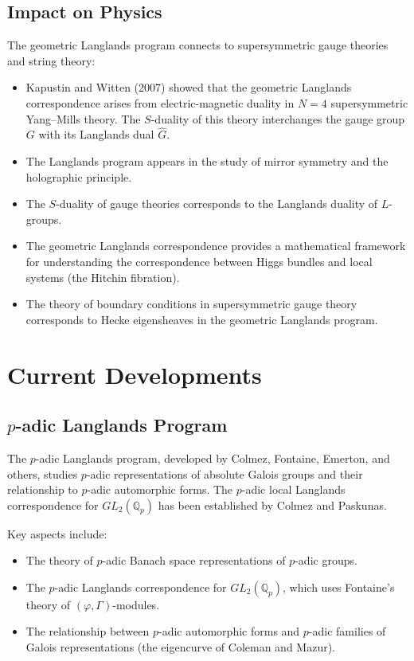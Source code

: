 \subsection{Impact on Physics}

The geometric Langlands program connects to supersymmetric gauge theories and string theory:
\begin{itemize}
\item Kapustin and Witten (2007) showed that the geometric Langlands correspondence arises from electric-magnetic duality in $N=4$ supersymmetric Yang--Mills theory. The $S$-duality of this theory interchanges the gauge group $G$ with its Langlands dual $\widehat{G}$.
\item The Langlands program appears in the study of mirror symmetry and the holographic principle.
\item The $S$-duality of gauge theories corresponds to the Langlands duality of $L$-groups.
\item The geometric Langlands correspondence provides a mathematical framework for understanding the correspondence between Higgs bundles and local systems (the Hitchin fibration).
\item The theory of boundary conditions in supersymmetric gauge theory corresponds to Hecke eigensheaves in the geometric Langlands program.
\end{itemize}

\section{Current Developments}

\subsection{\texorpdfstring{$p$}{p}-adic Langlands Program}

The $p$-adic Langlands program, developed by Colmez, Fontaine, Emerton, and others, studies $p$-adic representations of absolute Galois groups and their relationship to $p$-adic automorphic forms. The $p$-adic local Langlands correspondence for $GL_2(\mathbb{Q}_p)$ has been established by Colmez and Paskunas.

Key aspects include:
\begin{itemize}
\item The theory of $p$-adic Banach space representations of $p$-adic groups.
\item The $p$-adic Langlands correspondence for $GL_2(\mathbb{Q}_p)$, which uses Fontaine's theory of $(\varphi, \Gamma)$-modules.
\item The relationship between $p$-adic automorphic forms and $p$-adic families of Galois representations (the eigencurve of Coleman and Mazur).
\end{itemize}

